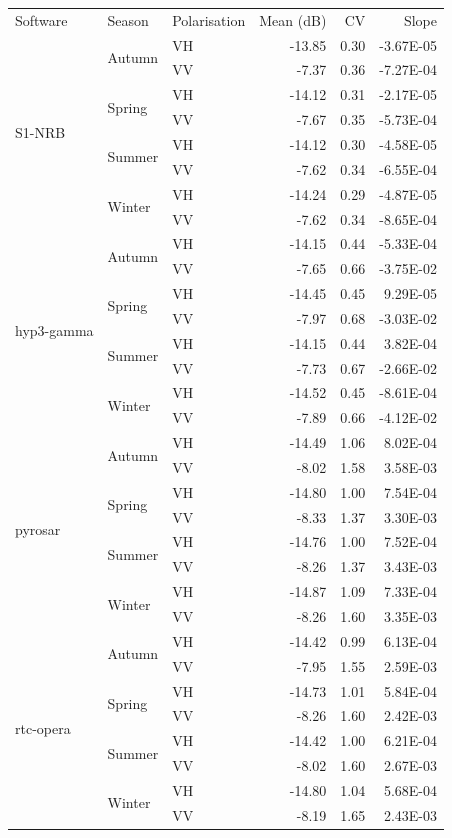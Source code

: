 \documentclass{article}
\begin{document}
\begin{tabular}{lllrrr}
Software & Season & Polarisation & Mean (dB) & CV & Slope \\
\multirow[c]{8}{*}{S1-NRB} & \multirow[c]{2}{*}{Autumn} & VH & -13.85 & 0.30 & -3.67E-05 \\
 &  & VV & -7.37 & 0.36 & -7.27E-04 \\
 & \multirow[c]{2}{*}{Spring} & VH & -14.12 & 0.31 & -2.17E-05 \\
 &  & VV & -7.67 & 0.35 & -5.73E-04 \\
 & \multirow[c]{2}{*}{Summer} & VH & -14.12 & 0.30 & -4.58E-05 \\
 &  & VV & -7.62 & 0.34 & -6.55E-04 \\
 & \multirow[c]{2}{*}{Winter} & VH & -14.24 & 0.29 & -4.87E-05 \\
 &  & VV & -7.62 & 0.34 & -8.65E-04 \\
\multirow[c]{8}{*}{hyp3-gamma} & \multirow[c]{2}{*}{Autumn} & VH & -14.15 & 0.44 & -5.33E-04 \\
 &  & VV & -7.65 & 0.66 & -3.75E-02 \\
 & \multirow[c]{2}{*}{Spring} & VH & -14.45 & 0.45 & 9.29E-05 \\
 &  & VV & -7.97 & 0.68 & -3.03E-02 \\
 & \multirow[c]{2}{*}{Summer} & VH & -14.15 & 0.44 & 3.82E-04 \\
 &  & VV & -7.73 & 0.67 & -2.66E-02 \\
 & \multirow[c]{2}{*}{Winter} & VH & -14.52 & 0.45 & -8.61E-04 \\
 &  & VV & -7.89 & 0.66 & -4.12E-02 \\
\multirow[c]{8}{*}{pyrosar} & \multirow[c]{2}{*}{Autumn} & VH & -14.49 & 1.06 & 8.02E-04 \\
 &  & VV & -8.02 & 1.58 & 3.58E-03 \\
 & \multirow[c]{2}{*}{Spring} & VH & -14.80 & 1.00 & 7.54E-04 \\
 &  & VV & -8.33 & 1.37 & 3.30E-03 \\
 & \multirow[c]{2}{*}{Summer} & VH & -14.76 & 1.00 & 7.52E-04 \\
 &  & VV & -8.26 & 1.37 & 3.43E-03 \\
 & \multirow[c]{2}{*}{Winter} & VH & -14.87 & 1.09 & 7.33E-04 \\
 &  & VV & -8.26 & 1.60 & 3.35E-03 \\
\multirow[c]{8}{*}{rtc-opera} & \multirow[c]{2}{*}{Autumn} & VH & -14.42 & 0.99 & 6.13E-04 \\
 &  & VV & -7.95 & 1.55 & 2.59E-03 \\
 & \multirow[c]{2}{*}{Spring} & VH & -14.73 & 1.01 & 5.84E-04 \\
 &  & VV & -8.26 & 1.60 & 2.42E-03 \\
 & \multirow[c]{2}{*}{Summer} & VH & -14.42 & 1.00 & 6.21E-04 \\
 &  & VV & -8.02 & 1.60 & 2.67E-03 \\
 & \multirow[c]{2}{*}{Winter} & VH & -14.80 & 1.04 & 5.68E-04 \\
 &  & VV & -8.19 & 1.65 & 2.43E-03 \\
\end{tabular}
\end{document}
